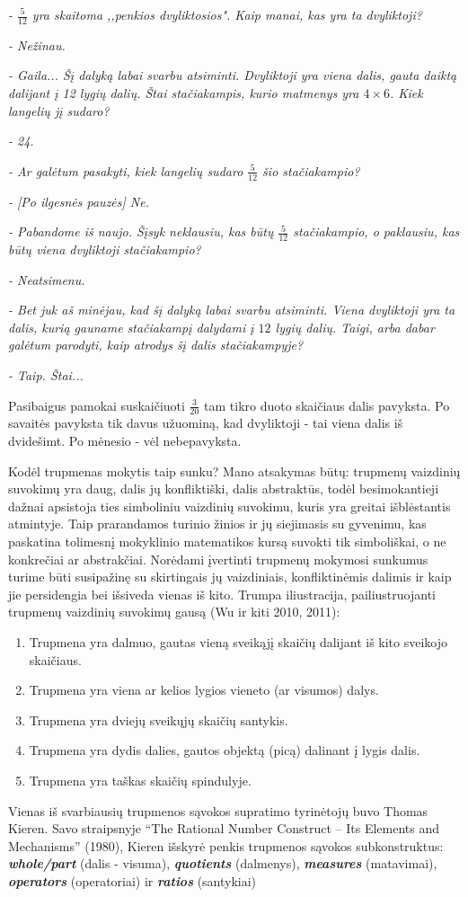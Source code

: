 \documentclass[a4paper]{article}
\begin{document}
\textit{- $\frac{5}{12}$ yra skaitoma ,,penkios dvyliktosios". Kaip manai, kas yra ta dvyliktoji?}

\textit{- Nežinau.}

\textit{- Gaila... Šį dalyką labai svarbu atsiminti. Dvyliktoji yra viena dalis, gauta daiktą dalijant į 12 lygių dalių. Štai stačiakampis, kurio matmenys yra $4\times 6$. Kiek langelių jį sudaro?}

\textit{- 24.}

\textit{- Ar galėtum pasakyti, kiek langelių sudaro $\frac{5}{12}$ šio stačiakampio?}

\textit{-  [Po ilgesnės pauzės] Ne.}

\textit{-  Pabandome iš naujo. Šįsyk neklausiu, kas būtų $\frac{5}{12}$ stačiakampio, o paklausiu, kas būtų viena dvyliktoji stačiakampio?}

\textit{-  Neatsimenu.}

\textit{- Bet juk aš minėjau, kad šį dalyką labai svarbu atsiminti. Viena dvyliktoji yra ta dalis, kurią gauname stačiakampį dalydami į $12$ lygių dalių. Taigi, arba dabar galėtum parodyti, kaip atrodys šį dalis stačiakampyje?}

\textit{- Taip. Štai...}

Pasibaigus pamokai suskaičiuoti $\frac{3}{20}$ tam tikro duoto skaičiaus dalis pavyksta. Po savaitės pavyksta tik davus užuominą, kad dvyliktoji - tai viena dalis iš dvidešimt. Po mėnesio - vėl nebepavyksta. 

Kodėl trupmenas mokytis taip sunku? Mano atsakymas būtų: trupmenų vaizdinių suvokimų yra daug, dalis jų konfliktiški, dalis abstraktūs, todėl besimokantieji dažnai apsistoja ties simboliniu vaizdinių suvokimu, kuris yra greitai išblėstantis atmintyje. Taip prarandamos turinio žinios ir jų siejimasis su gyvenimu, kas paskatina tolimesnį mokyklinio matematikos kursą suvokti tik simboliškai, o ne konkrečiai ar abstrakčiai. Norėdami įvertinti trupmenų mokymosi sunkumus turime būti susipažinę su skirtingais jų vaizdiniais, konfliktinėmis dalimis ir kaip jie persidengia bei išsiveda vienas iš kito. Trumpa iliustracija, pailiustruojanti trupmenų vaizdinių suvokimų gausą (Wu ir kiti 2010, 2011):
\begin{enumerate}
\item Trupmena yra dalmuo, gautas vieną sveikąjį skaičių dalijant iš kito sveikojo skaičiaus.
\item Trupmena yra viena ar kelios lygios vieneto (ar visumos) dalys.
\item Trupmena yra dviejų sveikųjų skaičių santykis.
\item Trupmena yra dydis dalies, gautos objektą (picą) dalinant į lygis dalis.
\item Trupmena yra taškas skaičių spindulyje.
\end{enumerate}
Vienas iš svarbiausių trupmenos sąvokos supratimo tyrinėtojų buvo Thomas Kieren. Savo straipsnyje “The Rational Number Construct – Its Elements and Mechanisms” (1980), Kieren išskyrė penkis trupmenos sąvokos subkonstruktus: \textit{\textbf{whole/part}} (dalis - visuma), \textit{\textbf{quotients}} (dalmenys), \textit{\textbf{measures}} (matavimai), \textit{\textbf{operators}} (operatoriai) ir \textit{\textbf{ratios}} (santykiai)
\end{document}
